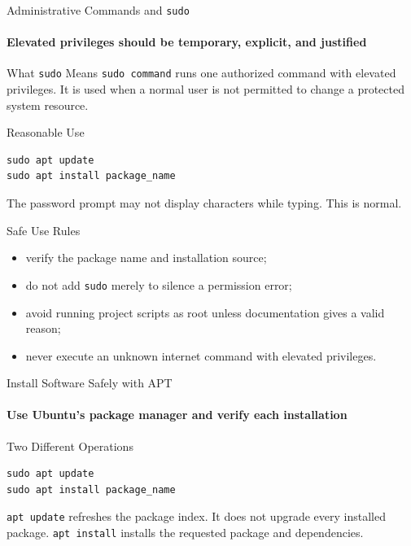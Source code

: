 \begin{frame}[fragile]{Administrative Commands and \texttt{sudo}}
\framesubtitle{Elevated privileges should be temporary, explicit, and justified}

\footnotesize

\begin{block}{What \texttt{sudo} Means}
\texttt{sudo command} runs one authorized command with elevated privileges.
It is used when a normal user is not permitted to change a protected system resource.
\end{block}

\begin{exampleblock}{Reasonable Use}
\begin{verbatim}
sudo apt update
sudo apt install package_name
\end{verbatim}
The password prompt may not display characters while typing. This is normal.
\end{exampleblock}

\begin{alertblock}{Safe Use Rules}
\begin{itemize}
    \setlength{\itemsep}{0.18em}
    \item verify the package name and installation source;
    \item do not add \texttt{sudo} merely to silence a permission error;
    \item avoid running project scripts as root unless documentation gives a valid reason;
    \item never execute an unknown internet command with elevated privileges.
\end{itemize}
\end{alertblock}
\end{frame}

\begin{frame}[fragile]{Install Software Safely with APT}
\framesubtitle{Use Ubuntu's package manager and verify each installation}

\footnotesize

\begin{block}{Two Different Operations}
\begin{verbatim}
sudo apt update
sudo apt install package_name
\end{verbatim}
\texttt{apt update} refreshes the package index. It does not upgrade every
installed package. \texttt{apt install} installs the requested package and dependencies.
\end{block}
\end{frame}


